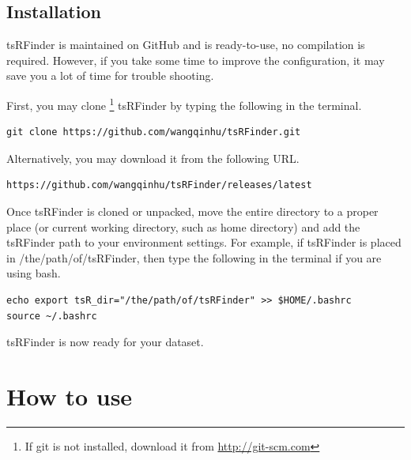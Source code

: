 \documentclass[11pt, a4paper]{article}
\begin{document}
\subsection{Installation}

tsRFinder is maintained on GitHub and is ready-to-use, no compilation is required. However, if you take some time to improve the configuration, it may save you a lot of time for trouble shooting.

First, you may clone \footnote{If git is not installed, download it from \url{http://git-scm.com}} tsRFinder by typing the following in the terminal.

{\footnotesize \begin{tcolorbox}[colback=blue!5!white,colframe=blue!75!black,title=Clone tsRFinder]
\begin{verbatim}
git clone https://github.com/wangqinhu/tsRFinder.git
\end{verbatim}
\end{tcolorbox}}

Alternatively, you may download it from the following URL.

{\footnotesize \begin{tcolorbox}[colback=blue!5!white,colframe=blue!75!black,title=Latest release of tsRFinder]
\begin{verbatim}
https://github.com/wangqinhu/tsRFinder/releases/latest
\end{verbatim}
\end{tcolorbox}}

Once tsRFinder is cloned or unpacked, move the entire directory to a proper place (or current working directory, such as home directory) and add the tsRFinder path to your environment settings. For example, if tsRFinder is placed in /the/path/of/tsRFinder, then type the following in the terminal if you are using bash.


{\footnotesize \begin{tcolorbox}[colback=blue!5!white,colframe=blue!75!black,title=Setup tsRFinder]
\begin{verbatim}
echo export tsR_dir="/the/path/of/tsRFinder" >> $HOME/.bashrc
source ~/.bashrc
\end{verbatim}
\end{tcolorbox}}

tsRFinder is now ready for your dataset.

\section{How to use}
\end{document}
